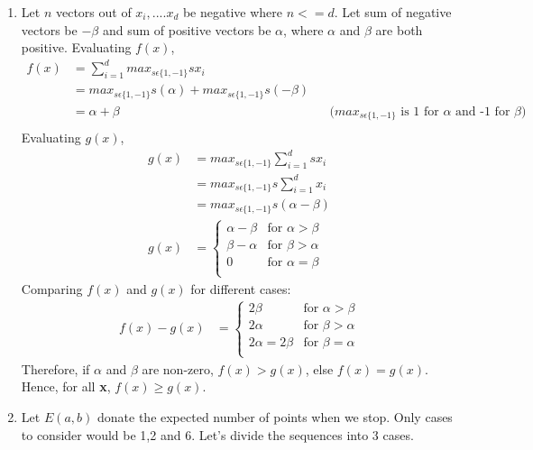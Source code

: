 \documentclass[12pt]{article}
\begin{document}
\begin{enumerate}[label=(\alph*)]
\linebreak
\item Let $n$ vectors out of $x_i, .... x_d$ be negative where $n <= d$. Let sum of negative vectors be $-\beta$ and sum of positive vectors be $\alpha$, where $\alpha$ and $\beta$ are both positive.
Evaluating $f(x)$,
\begin{align*}
f(x) & = \sum_{i=1}^{d} max_{s\epsilon\{1,-1\}} sx_i \\
& =  max_{s\epsilon\{1,-1\}} s(\alpha) + max_{s\epsilon\{1,-1\}} s(-\beta)\\
& =  \alpha + \beta && \text{($max_{s\epsilon\{1,-1\}}$ is 1 for $\alpha$ and -1 for $\beta$)}\\
\end{align*}
\linebreak
Evaluating $g(x)$,
\begin{equation*}\
\begin{split}
g(x) & = max_{s\epsilon\{1,-1\}}\sum_{i=1}^{d} sx_i \\
& = max_{s\epsilon\{1,-1\}}s\sum_{i=1}^{d} x_i \\
& = max_{s\epsilon\{1,-1\}}s(\alpha - \beta)\\
g(x) & = \begin{cases}
\alpha - \beta & \text{for } \alpha > \beta \\
\beta - \alpha & \text{for } \beta > \alpha \\
0 & \text{for } \alpha = \beta \\
\end{cases}
\end{split}
\end{equation*}
Comparing $f(x)$ and $g(x)$ for different cases:
\begin{equation*}\
\begin{split}
f(x) - g(x) & = \begin{cases}
2\beta & \text{for } \alpha > \beta \\
2\alpha & \text{for } \beta > \alpha \\
2\alpha = 2\beta & \text{for } \beta = \alpha \\
\end{cases}
\end{split}
\end{equation*}
Therefore, if $\alpha$ and $\beta$ are non-zero, $f(x) > g(x)$, else $f(x) = g(x)$. Hence, for all \textbf{x}, $f(x) \geq g(x)$. \\
\linebreak
\item Let $E(a, b)$ donate the expected number of points when we stop. Only cases to consider would be 1,2 and 6. Let's divide the sequences into 3 cases. \\

\end{enumerate}
\end{document}
